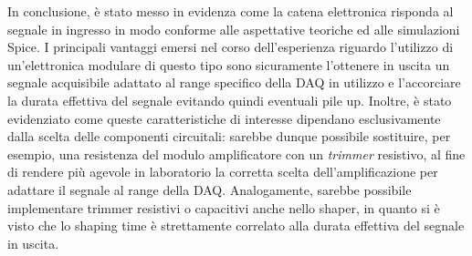 \documentclass[a4paper,11pt]{article} %
\begin{document}
In conclusione, è stato messo in evidenza come la catena elettronica risponda al segnale in ingresso in modo conforme
alle aspettative teoriche ed alle simulazioni Spice. I principali vantaggi emersi nel corso dell'esperienza riguardo
l'utilizzo di un'elettronica modulare di questo tipo sono sicuramente l'ottenere in uscita un segnale acquisibile
adattato al range specifico della DAQ in utilizzo e l'accorciare la durata effettiva del segnale evitando quindi
eventuali pile up. Inoltre, è stato evidenziato come queste caratteristiche di interesse dipendano esclusivamente dalla
scelta delle componenti circuitali: sarebbe dunque possibile sostituire, per esempio, una resistenza del modulo
amplificatore con un \textit{trimmer} resistivo, al fine di rendere più agevole in laboratorio la corretta scelta
dell'amplificazione per adattare il segnale al range della DAQ. Analogamente, sarebbe possibile implementare trimmer
resistivi o capacitivi anche nello shaper, in quanto si è visto che lo shaping time è strettamente correlato alla durata
effettiva del segnale in uscita. 


\end{document}
